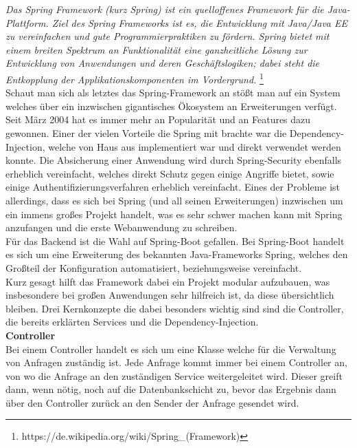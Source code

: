 \emph{\glqq   
Das Spring Framework (kurz Spring) ist ein quelloffenes Framework für die Java-Plattform. Ziel des Spring Frameworks ist es, die Entwicklung mit Java/Java EE zu vereinfachen und gute Programmierpraktiken zu fördern. Spring bietet mit einem breiten Spektrum an Funktionalität eine ganzheitliche Lösung zur Entwicklung von Anwendungen und deren Geschäftslogiken; dabei steht die Entkopplung der Applikationskomponenten im Vordergrund.
\grqq} \footnote{https://de.wikipedia.org/wiki/Spring\_(Framework)} \\

Schaut man sich als letztes das Spring-Framework an stößt man auf ein System welches über ein inzwischen gigantisches Ökosystem an Erweiterungen verfügt. Seit März 2004 hat es immer mehr an Popularität und an Features dazu gewonnen. Einer der vielen Vorteile die Spring mit brachte war die Dependency-Injection, welche von Haus aus implementiert war und direkt verwendet werden konnte. Die Absicherung einer Anwendung wird durch Spring-Security ebenfalls erheblich vereinfacht, welches direkt Schutz gegen einige Angriffe bietet, sowie einige Authentifizierungsverfahren erheblich vereinfacht. Eines der Probleme ist allerdings, dass es sich bei Spring (und all seinen Erweiterungen) inzwischen um ein immens großes Projekt handelt, was es sehr schwer machen kann mit Spring anzufangen und die erste Webanwendung zu schreiben. \\

Für das Backend ist die Wahl auf Spring-Boot gefallen. Bei Spring-Boot handelt es sich um eine Erweiterung des bekannten Java-Frameworks Spring, welches den Großteil der Konfiguration automatisiert, beziehungsweise vereinfacht.\\
Kurz gesagt hilft das Framework dabei ein Projekt modular aufzubauen, was insbesondere bei großen Anwendungen sehr hilfreich ist, da diese übersichtlich bleiben. Drei Kernkonzepte die dabei besonders wichtig sind sind die Controller, die bereits erklärten Services und die Dependency-Injection. \\

\textbf{Controller}\\
Bei einem Controller handelt es sich um eine Klasse welche für die Verwaltung von Anfragen zuständig ist. Jede Anfrage kommt immer bei einem Controller an, von wo die Anfrage an den zuständigen Service weitergeleitet wird. Dieser greift dann, wenn nötig, noch auf die Datenbankschicht zu, bevor das Ergebnis dann über den Controller zurück an den Sender der Anfrage gesendet wird.\\

